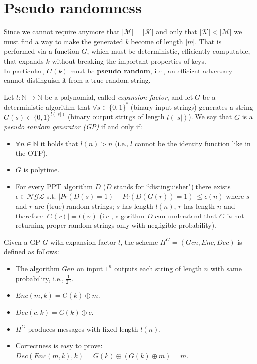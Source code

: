\documentclass[../main]{subfiles}
\begin{document}
\section{Pseudo randomness}
Since we cannot require anymore that $|\mathcal{M}| = |\mathcal{K}|$ and only that $|\mathcal{K}| < |\mathcal{M}|$ we must find a way to make the generated $k$ become of length $|m|$.
That is performed via a function $G$, which must be deterministic, efficiently computable, that expands $k$ without breaking the important properties of keys.\\
In particular, $G(k)$ must be \textbf{pseudo random}, i.e., an efficient adversary cannot distinguish it from a true random string.

\begin{definition}
    Let $l:\mathbb{N}\rightarrow{}\mathbb{N}$ be a polynomial, called \textit{expansion factor}, and let $G$ be a deterministic algorithm that $\forall{} s \in{} \{0,1\}^*$ (binary input strings) generates a string $G(s) \in{} \{0,1\}^{l(|s|)}$ (binary output strings of length $l(|s|)$).
    We say that $G$ is a \textit{pseudo random generator (GP)} if and only if:
    \begin{itemize}
        \item $\forall{}n \in{} \mathbb{N}$ it holds that $l(n) > n$ (i.e., $l$ cannot be the identity function like in the OTP).
        \item $G$ is polytime.
        \item For every PPT algorithm $D$ ($D$ stands for ``distinguisher") there exists $\epsilon{} \in{} \mathcal{NGL}$ s.t. $|Pr(D(s) = 1) - Pr(D(G(r)) = 1)| \le{} \epsilon(n)$ where $s$ and $r$ are (true) random strings; $s$ has length $l(n)$, $r$ has length $n$ and therefore $|G(r)|=l(n)$ (i.e., algorithm $D$ can understand that $G$ is not returning proper random strings only with negligible probability).
    \end{itemize}
\end{definition}

\begin{definition}
    Given a GP $G$ with expansion factor $l$, the scheme $\Pi^G = (Gen,Enc,Dec)$ is defined as follows:
    \begin{itemize}
        \item The algorithm $Gen$ on input $1^n$ outputs each string of length $n$ with same probability, i.e., $\frac{1}{2^n}$.
        \item $Enc(m,k)=G(k)\oplus{}m$.
        \item $Dec(c,k)=G(k)\oplus{}c$.
        \item $\Pi^G$ produces messages with fixed length $l(n)$.
        \item Correctness is easy to prove: $Dec(Enc(m,k),k)=G(k)\oplus(G(k)\oplus m)=m$.
    \end{itemize}
\end{definition}
\end{document}
